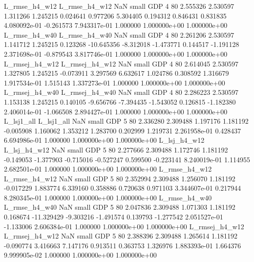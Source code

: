  L_rmse_h4_w12  L_rmse_h4_w12                   NaN      small      GDP                 4 80 2.555326       2.530597 1.311266       1.245215    0.024641      0.977206      5.304405     0.194312       0.846431  0.831835 4.080092e-01    -0.261573   7.943317e-01            1.000000    1.000000e+00        1.000000e+00
 L_rmse_h4_w40  L_rmse_h4_w40                   NaN      small      GDP                 4 80 2.261206       2.530597 1.141712       1.245215    0.123268    -10.645356     -8.312018    -1.473771       0.144517 -1.191128 2.371698e-01    -0.879543   3.817746e-01            1.000000    1.000000e+00        1.000000e+00
L_rmsej_h4_w12 L_rmsej_h4_w12                   NaN      small      GDP                 4 80 2.614045       2.530597 1.327805       1.245215   -0.073911      3.297569      6.632617     1.024786       0.308592  1.316679 1.917534e-01     1.515143   1.337273e-01            1.000000    1.000000e+00        1.000000e+00
L_rmsej_h4_w40 L_rmsej_h4_w40                   NaN      small      GDP                 4 80 2.286223       2.530597 1.153138       1.245215    0.140105     -9.656766     -7.394435    -1.543052       0.126815 -1.182380 2.406014e-01    -1.066508   2.894427e-01            1.000000    1.000000e+00        1.000000e+00
    L_lsj1_all     L_lsj1_all                   NaN      small      GDP                 5 80 2.336280       2.309488 1.197176       1.181192   -0.005908      1.160062      1.353212     1.283700       0.202999  1.219731 2.261958e-01     0.428437   6.694986e-01            1.000000    1.000000e+00        1.000000e+00
  L_lsj_h4_w12   L_lsj_h4_w12                   NaN      small      GDP                 5 80 2.277666       2.309488 1.172746       1.181192   -0.149053     -1.377903     -0.715016    -0.527247       0.599500 -0.223141 8.240019e-01     1.114955   2.682501e-01            1.000000    1.000000e+00        1.000000e+00
 L_rmse_h4_w12  L_rmse_h4_w12                   NaN      small      GDP                 5 80 2.352994       2.309488 1.256070       1.181192   -0.017229      1.883774      6.339160     0.358886       0.720638  0.971103 3.344607e-01     0.217944   8.280345e-01            1.000000    1.000000e+00        1.000000e+00
 L_rmse_h4_w40  L_rmse_h4_w40                   NaN      small      GDP                 5 80 2.047836       2.309488 1.071303       1.181192    0.168674    -11.329429     -9.303216    -1.491574       0.139793 -1.277542 2.051527e-01    -1.133006   2.606384e-01            1.000000    1.000000e+00        1.000000e+00
L_rmsej_h4_w12 L_rmsej_h4_w12                   NaN      small      GDP                 5 80 2.388396       2.309488 1.265614       1.181192   -0.090774      3.416663      7.147176     0.913511       0.363753  1.326976 1.883393e-01     1.664376   9.999905e-02            1.000000    1.000000e+00        1.000000e+00
